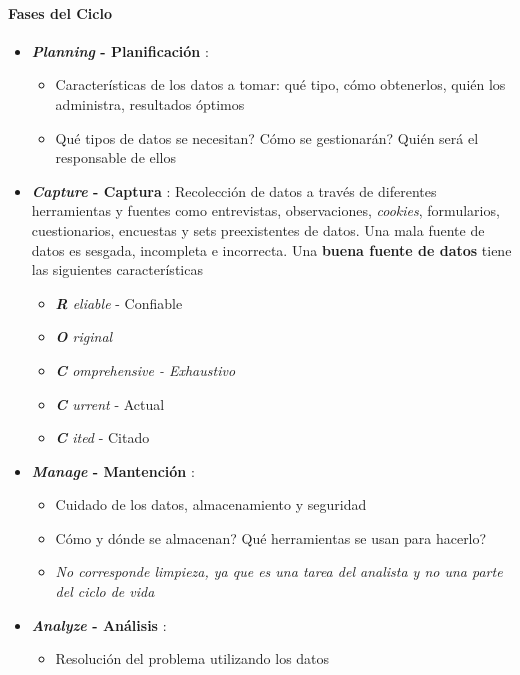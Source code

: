 \paragraph{Fases del Ciclo}
\begin{itemize}
    \item {\textbf{\textit{Planning} - Planificación} :
    \begin{itemize}
        \item {Características de los datos a tomar: qué tipo, cómo obtenerlos, quién los administra, resultados óptimos}
        \item {Qué tipos de datos se necesitan? Cómo se gestionarán? Quién será el responsable de ellos}
    \end{itemize}}
    \item {\textbf{\textit{Capture} - Captura} : Recolección de datos a través de diferentes herramientas y fuentes como entrevistas, observaciones, \textit{cookies}, formularios, cuestionarios, encuestas y sets preexistentes de datos. Una mala fuente de datos es sesgada, incompleta e incorrecta. Una \textbf{buena fuente de datos} tiene las siguientes características
    \begin{itemize}
            \item {\textit{\textbf{R} eliable} - Confiable}
            \item {\textit{\textbf{O} riginal}}
            \item {\textit{\textbf{C} omprehensive - Exhaustivo}}
            \item {\textit{\textbf{C} urrent} - Actual}
            \item {\textit{\textbf{C} ited} - Citado}
        \end{itemize}}
    \item {\textbf{\textit{Manage} - Mantención} :
    \begin{itemize}
        \item {Cuidado de los datos, almacenamiento y seguridad}
        \item {Cómo y dónde se almacenan? Qué herramientas se usan para hacerlo?}
        \item {\textit{No corresponde limpieza, ya que es una tarea del analista y no una parte del ciclo de vida}}
    \end{itemize}}
    \item {\textbf{\textit{Analyze} - Análisis} :
    \begin{itemize}
        \item {Resolución del problema utilizando los datos}

\end{itemize}}
\end{itemize}

